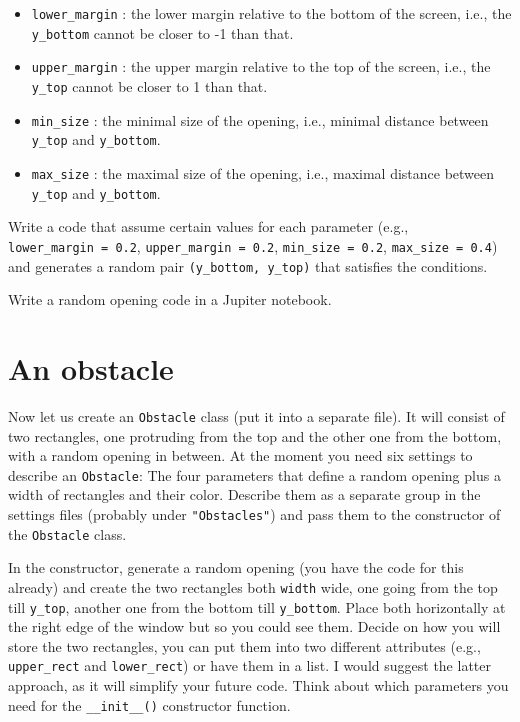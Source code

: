 \documentclass[
]{book}
\providecommand{\tightlist}{%
  \setlength{\itemsep}{0pt}\setlength{\parskip}{0pt}}
\begin{document}
\begin{itemize}
\tightlist
\item
  \texttt{lower\_margin} : the lower margin relative to the bottom of the screen, i.e., the \texttt{y\_bottom} cannot be closer to -1 than that.
\item
  \texttt{upper\_margin} : the upper margin relative to the top of the screen, i.e., the \texttt{y\_top} cannot be closer to 1 than that.
\item
  \texttt{min\_size} : the minimal size of the opening, i.e., minimal distance between \texttt{y\_top} and \texttt{y\_bottom}.
\item
  \texttt{max\_size} : the maximal size of the opening, i.e., maximal distance between \texttt{y\_top} and \texttt{y\_bottom}.
\end{itemize}

Write a code that assume certain values for each parameter (e.g., \texttt{lower\_margin\ =\ 0.2}, \texttt{upper\_margin\ =\ 0.2}, \texttt{min\_size\ =\ 0.2}, \texttt{max\_size\ =\ 0.4}) and generates a random pair \texttt{(y\_bottom,\ y\_top)} that satisfies the conditions.

Write a random opening code in a Jupiter notebook.

\hypertarget{an-obstacle}{%
\section{An obstacle}\label{an-obstacle}}

Now let us create an \texttt{Obstacle} class (put it into a separate file). It will consist of two rectangles, one protruding from the top and the other one from the bottom, with a random opening in between. At the moment you need six settings to describe an \texttt{Obstacle}: The four parameters that define a random opening plus a width of rectangles and their color. Describe them as a separate group in the settings files (probably under \texttt{"Obstacles"}) and pass them to the constructor of the \texttt{Obstacle} class.

In the constructor, generate a random opening (you have the code for this already) and create the two rectangles both \texttt{width} wide, one going from the top till \texttt{y\_top}, another one from the bottom till \texttt{y\_bottom}. Place both horizontally at the right edge of the window but so you could see them. Decide on how you will store the two rectangles, you can put them into two different attributes (e.g., \texttt{upper\_rect} and \texttt{lower\_rect}) or have them in a list. I would suggest the latter approach, as it will simplify your future code. Think about which parameters you need for the \texttt{\_\_init\_\_()} constructor function.
\end{document}
